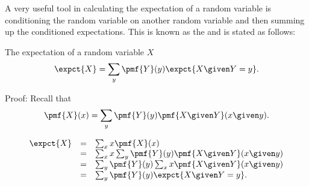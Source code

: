 {A very useful tool in calculating the expectation of a random variable
is conditioning the random variable on another random variable and
then summing up the conditioned expectations.  This is known as the
 and is stated as follows:

The expectation of a random variable $X$ 
\[
\expct{X} = \sum_{y} { \pmf{Y}(y) \expct{X \given Y = y}}.
\]

\begin{notesonly}
Proof:
Recall that 
\[
\pmf{X}(x) = \sum_{y} {\pmf{Y}(y) \pmf{X \given Y}(x \given y)}.
\]

\[
\begin{array}{lll}
\expct{X} & = & \sum_{x}{x \pmf{X}(x)}
\\
& = & \sum_{x}{x \sum_{y} {\pmf{Y}(y) \pmf{X \given Y}(x \given y)}}
\\
& = & \sum_{y}{\pmf{Y}(y) \sum_{x} { x \pmf{X \given Y}(x \given y)}}
\\
& = & \sum_{y}{\pmf{Y}(y) \expct{X \given Y = y}}.
\end{array}
\]

\end{notesonly}




\newpage

}

\flushchapter
